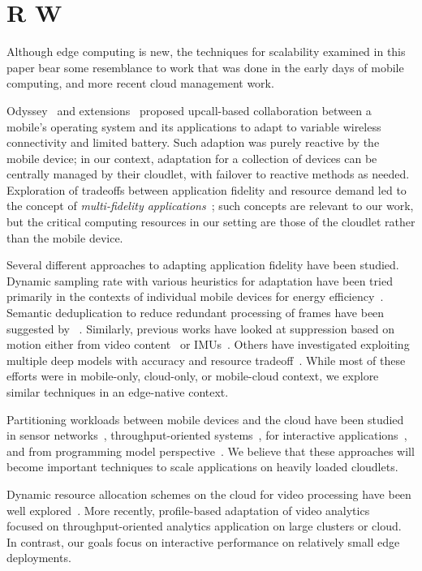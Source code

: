 \section{R W}
\label{sec: resource-management-related}

Although edge computing is new, the techniques for scalability
examined in this paper bear some resemblance to work that was done in
the early days of mobile computing, and more recent cloud management
work.

Odyssey~\cite{Noble1997} and extensions~\cite{Flinn1999} proposed upcall-based
collaboration between a mobile's operating system and its applications to adapt
to variable wireless connectivity and limited battery. Such adaption was purely
reactive by the mobile device; in our context, adaptation for a collection of
devices can be centrally managed by their cloudlet, with failover to reactive
methods as needed. Exploration of tradeoffs between application fidelity and
resource demand led to the concept of {\em multi-fidelity
applications}~\cite{Satya1999}; such concepts are relevant to our work, but the
critical computing resources in our setting are those of the cloudlet rather
than the mobile device.

Several different approaches to adapting application fidelity have been studied.
Dynamic sampling rate with various heuristics for adaptation have been tried
primarily in the contexts of individual mobile devices for energy
efficiency~\cite{lorincz2009mercury, lorincz2008resource, vallina2012energy,
lane2010survey}. Semantic deduplication to reduce redundant processing of frames
have been suggested by ~\cite{Hu2015, kang2017noscope, hsieh2018focus,
zhang2015design}. Similarly, previous works have looked at suppression based on
motion either from video content~\cite{naderiparizi2017glimpse,
lebeckcollaborative} or IMUs~\cite{jain2015overlay}. Others have investigated
exploiting multiple deep models with accuracy and resource
tradeoff~\cite{han2016mcdnn,jiang2018chameleon}. While most of these efforts
were in mobile-only, cloud-only, or mobile-cloud context, we explore similar
techniques in an edge-native context.


Partitioning workloads between mobile devices and the cloud have been
studied in sensor networks~\cite{newton2009wishbone},
throughput-oriented systems~\cite{cuervo2010maui, yi2017lavea}, for
interactive applications~\cite{ra2011odessa, chen2015glimpse}, and
from programming model perspective~\cite{balan2003tactics}. We believe
that these approaches will become important techniques to scale
applications on heavily loaded cloudlets.

Dynamic resource allocation schemes on the cloud for video processing have been
well explored~\cite{sembiring2013dynamic, fu2015drs, kaseb2015cloud}.  More
recently, profile-based adaptation of video analytics~\cite{zhang2017live,
hung2018videoedge, jiang2018chameleon} focused on throughput-oriented analytics
application on large clusters or cloud. In contrast, our goals focus on
interactive performance on relatively small edge deployments.



